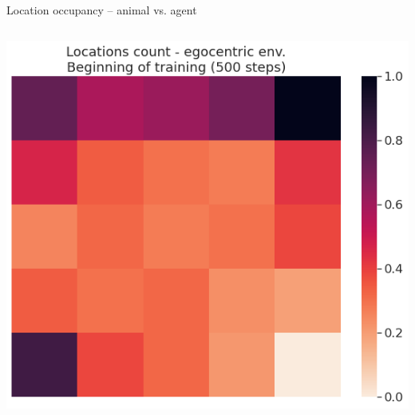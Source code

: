 \documentclass[bigger]{beamer}
\begin{document}
\begin{frame}[label={sec:orga5015db}]{Location occupancy -- animal vs. agent}
\begin{columns}
\begin{column}{0.5\columnwidth}
\begin{center}
\end{center}
\begin{center}
\includegraphics[height=0.4\textheight]{img/q-learning_ego_locations_count_500steps_all_cues.png}
\end{center}
\end{column}
\end{columns}
\end{frame}
\end{document}

